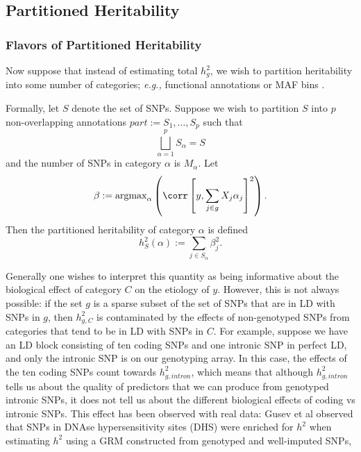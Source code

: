 \subsection{Partitioned Heritability}

\subsubsection{Flavors of Partitioned Heritability}\label{MV}

Now suppose that instead of estimating total $h^2_g$, we wish to partition heritability into some number of categories;
\emph{e.g.,} functional annotations \cite{gusevregulatory, finucane2014partitioning} or MAF bins \cite{lee2013estimation}.

Formally, let $S$ denote the set of SNPs. 
Suppose we wish to partition $S$ into $p$ non-overlapping annotations $part := {S_1,\ldots,S_p}$ such that 
\begin{equation}
	\bigsqcup_{\alpha=1}^p S_\alpha = S
\end{equation}
and the number of SNPs in category $\alpha$ is $M_\alpha$. Let
\begin{equation}\label{beta}
	\beta := \mathrm{argmax}_\alpha\left( \corr\left[y, \sum_{j\in g} X_j\alpha_j\right]^2 \right).
\end{equation}
Then the partitioned heritability of category $\alpha$ is defined
\begin{equation}
	h^2_S(\alpha) := \sum_{j\in S_\alpha} \beta_j^2.
\end{equation}

Generally one wishes to interpret this quantity as being informative about the biological effect of category 
$C$ on the etiology of $y$.
However, this is not always possible: if the set $g$ is a sparse subset of the set of SNPs that are in LD with SNPs in $g$, then
$h^2_{g,C}$ is contaminated by the effects of non-genotyped SNPs from categories that tend to be in LD with SNPs in $C$.
For example, suppose we have an LD block consisting of ten coding SNPs 
and one intronic SNP in perfect LD, and only the intronic SNP is on our genotyping array. 
In this case, the effects of the ten coding SNPs count towards
$h^2_{g,intron}$, which means that although $h^2_{g,intron}$ tells us about the quality of predictors that we can produce
from genotyped intronic SNPs, it does not tell us about the different biological effects of coding vs intronic SNPs. 
This effect has been observed with real data: 
Gusev et al \cite{gusevregulatory} observed that SNPs in DNAse hypersensitivity sites (DHS)
were enriched for $h^2$ when estimating $h^2$ using a GRM constructed from genotyped and well-imputed SNPs,

